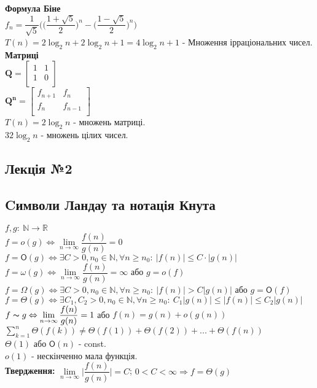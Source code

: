\documentclass[a4paper,12pt]{article}
\newcommand{\dsum}{\displaystyle\sum}
\begin{document}
\newpage
    \textbf{Формула Біне} \\
    $f_n=\dfrac{1}{\sqrt{5}}\biggl(\biggl(\dfrac{1+\sqrt{5}}{2}\biggr)^n-\biggl(\dfrac{1-\sqrt{5}}{2}\biggr)^n\biggr)$ \\
    $T(n)=2\log_2n+2\log_2n+1=4\log_2n+1$ - Множення ірраціональних чисел. \\
    \textbf{Матриці} \\
    $\mathbf{Q}= 
    \begin{bmatrix}
        1 & 1 \\
        1 & 0 \\
    \end{bmatrix}$ \\
    $\mathbf{Q^n}= 
    \begin{bmatrix}
        f_{n+1} & f_n \\
        f_n & f_{n-1} \\
    \end{bmatrix}$ \\
    $T(n)=2\log_2n$ - множень матриці. \\
    $32\log_2n$ - множень цілих чисел.

    \begin{center}
        \hrulefill
        \section{Лекція №2}
        \hrulefill
    \end{center}
    \subsection{Cимволи Ландау та нотація Кнута}
    $f,g:\:\mathbb{N} \rightarrow \mathbb{R}$ \\
    $f=o(g)\Leftrightarrow\lim\limits_{n\rightarrow\infty}\dfrac{f(n)}{g(n)}=0$ \\
    $f=\mathsf{O}(g)\Leftrightarrow\exists C>0,n_0\in\mathbb{N},\forall n\geqslant n_0:\:|f(n)|\leqslant C\cdot|g(n)|$ \\
    $f=\omega(g)\Leftrightarrow\lim\limits_{n\rightarrow\infty}\dfrac{f(n)}{g(n)}=\infty$ або $g=o(f)$ \\
    $f=\Omega(g)\Leftrightarrow\exists C>0,n_0\in\mathbb{N},\forall n\geqslant n_0:\:|f(n)|>C|g(n)|$ або $g=\mathsf{O}(f)$ \\
    $f=\Theta(g)\Leftrightarrow\exists C_1,C_2>0,n_0\in\mathbb{N},\forall n\geqslant n_0:\:C_1|g(n)|\leqslant|f(n)|\leqslant C_2|g(n)|$ \\
    $f\thicksim g\Leftrightarrow\lim\limits_{n\rightarrow\infty}\dfrac{f(n)}{g(n)}=1$ або $f(n)=g(n)+o(g(n))$ \\
    $\dsum\limits_{k=1}^{n}\Theta(f(k))\ne\Theta(f(1))+\Theta(f(2))+...+\Theta(f(n))$ \\
    $\Theta(1)$ або $\mathsf{O}(n)$ - const. \\
    $o(1)$ - нескінченно мала функція. \\
    \textbf{Твердження:} $\lim\limits_{n\rightarrow\infty}\bigg|\dfrac{f(n)}{g(n)}\bigg|=C$; $0<C<\infty\Rightarrow f=\Theta(g)$ \\
    
\end{document}
